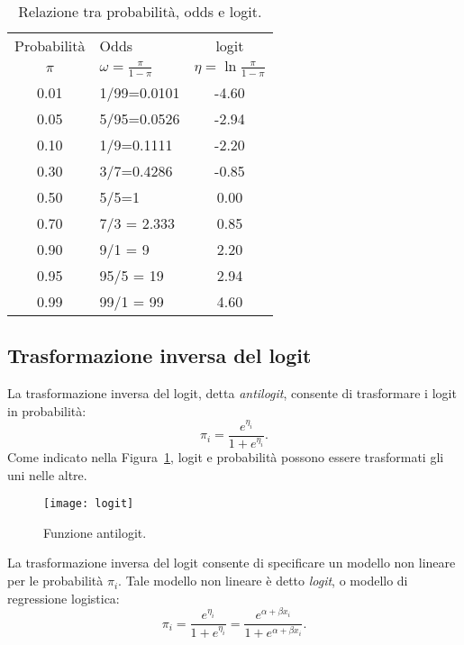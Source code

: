   \begin{table}
  \centering
    \begin{tabular}{clc}
      \toprule
      Probabilità & Odds & logit \\
      $\pi$ & $\omega= \frac{\pi}{1-\pi}$ & $ \eta= \ln \frac{\pi}{1-\pi}$ \\
      \midrule
      0.01 & 1/99=0.0101 & -4.60 \\[5pt]
      0.05 & 5/95=0.0526 & -2.94 \\[5pt]
      0.10 & 1/9=0.1111 & -2.20 \\[5pt]
      0.30 & 3/7=0.4286 & -0.85 \\[5pt]
      0.50 & 5/5=1 & 0.00 \\[5pt]
      0.70 & 7/3 = 2.333 & 0.85 \\[5pt]
      0.90 & 9/1 = 9 & 2.20 \\[5pt]
      0.95 & 95/5 = 19 & 2.94 \\[5pt]
      0.99 & 99/1 = 99 & 4.60 \\[5pt]
      \bottomrule
    \end{tabular}
  \caption{Relazione tra probabilità, odds e logit.}
  \label{tab:rel_proboddslogit}
  \end{table}

\subsection{Trasformazione inversa del logit}

La trasformazione inversa del logit, detta \emph{antilogit}, consente di trasformare i logit in probabilità:
  \[
  \pi_i =\frac{e^{\eta_i}}{1+e^{\eta_i}}.
  \]
Come indicato nella Figura~\ref{fig:antilogit}, logit e probabilità possono essere trasformati gli uni nelle altre.

\begin{figure}[h!]
  \begin{center}
    \texttt{[image: logit]}
  \end{center}
\caption{Funzione antilogit.}
\label{fig:antilogit}
\end{figure}

La trasformazione inversa del logit consente di specificare un modello non lineare per le probabilità $\pi_i$. Tale modello non lineare {\`e} detto \emph{logit}, o modello di regressione logistica:
  \begin{equation}
  \pi_i = \frac{e^{\eta_i}}{1+e^{\eta_i}} =  \frac{e^{\alpha + \beta x_i}}{1+e^{\alpha + \beta x_i}}.
  \end{equation}

